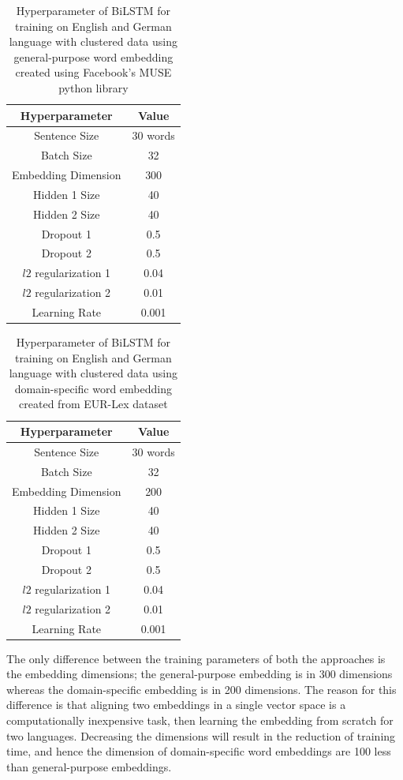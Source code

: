 \begin{table}[!ht]
\centering
\begin{tabular}{cc}
\hline
\textbf{Hyperparameter} & \textbf{Value} \\ \hline
Sentence Size & 30 words \\
Batch Size & 32 \\
Embedding Dimension & 300 \\
Hidden 1 Size & 40 \\
Hidden 2 Size & 40 \\
Dropout 1 & 0.5 \\
Dropout 2 & 0.5 \\
$l2$ regularization 1 & 0.04 \\
$l2$ regularization 2 & 0.01 \\
Learning Rate & 0.001 \\ \hline
\end{tabular}
\captionsetup{justification=centering,margin=1cm}
\caption{Hyperparameter of \gls{BiLSTM} for training on English and German language with clustered data using general-purpose word embedding created using Facebook's MUSE python library}
\label{table:FBMuseGeneralpurpose}
\end{table}

\begin{table}[!ht]
\centering
\begin{tabular}{cc}
\hline
\textbf{Hyperparameter} & \textbf{Value} \\ \hline
Sentence Size & 30 words \\
Batch Size & 32 \\
Embedding Dimension & 200 \\
Hidden 1 Size & 40 \\
Hidden 2 Size & 40 \\
Dropout 1 & 0.5 \\
Dropout 2 & 0.5 \\
$l2$ regularization 1 & 0.04 \\
$l2$ regularization 2 & 0.01 \\
Learning Rate & 0.001 \\ \hline
\end{tabular}
\captionsetup{justification=centering,margin=1cm}
\caption{Hyperparameter of \gls{BiLSTM} for training on English and German language with clustered data using domain-specific word embedding created from EUR-Lex dataset}
\label{table:DomainSpecificHyperparameter}
\end{table}

The only difference between the training parameters of both the approaches is the embedding dimensions; the general-purpose embedding is in 300 dimensions whereas the domain-specific embedding is in 200 dimensions. The reason for this difference is that aligning two embeddings in a single vector space is a computationally inexpensive task, then learning the embedding from scratch for two languages. Decreasing the dimensions will result in the reduction of training time, and hence the dimension of domain-specific word embeddings are 100 less than general-purpose embeddings.

